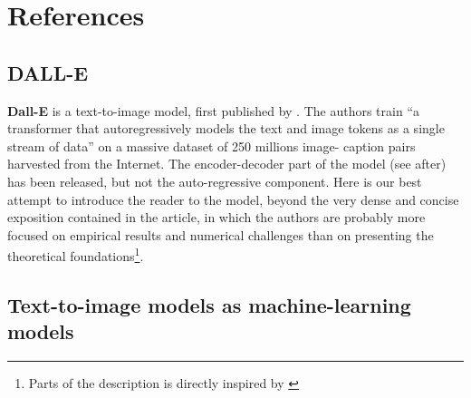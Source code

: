 \documentclass{article}
\begin{document}
\section*{References}


\printbibliography[
    heading = subbibintoc,
    type=article,
    title={Articles scientifiques}]
    
\printbibliography[
    heading = subbibintoc,
    type=online,
    title={Ressources en lignes}]
    
\pagebreak
{}
{}
\begin{appendix}

\section{DALL-E}

\newcommand{\pt}{p_\theta}
\newcommand{\pp}{p_\psi}
\newcommand{\ptp}{p_{\theta,\psi}}
\newcommand{\qp}{q_\phi}
\newcommand{\esp}{\mathbb{E}}
\newcommand{\KL}{D_{\mathrm{KL}}}
\newcommand{\elb}{\underline{\mathscr{l}}}
\newcommand{\elbtppx}{\underline{\mathscr{l}}_{\theta,\phi,\psi}(x)}

\textbf{Dall-E} is a text-to-image model, first published by \citet{zeroshot}. The authors train \enquote{a transformer that autoregressively models the text and image tokens as a single stream of data} on a massive dataset of 250 millions image- caption pairs harvested from the Internet. The encoder-decoder part of the model (see after) has been released, but not the auto-regressive component. Here is our best attempt to introduce the reader to the model, beyond the very dense and concise exposition contained in the article, in which the authors are probably more focused on empirical results and numerical challenges than on presenting the theoretical foundations\footnote{Parts of the description is directly inspired by \cite{probml-advanced} }.

\subsection{Text-to-image models as machine-learning models}


\end{appendix}
\end{document}
